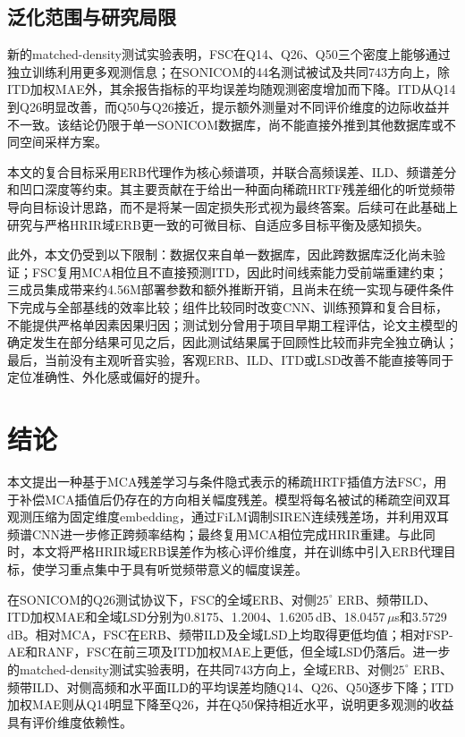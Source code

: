 \documentclass[UTF8,a4paper]{article}
\begin{document}


\subsection{泛化范围与研究局限}
新的matched-density测试实验表明，FSC在Q14、Q26、Q50三个密度上能够通过独立训练利用更多观测信息；在SONICOM的44名测试被试及共同743方向上，除ITD加权MAE外，其余报告指标的平均误差均随观测密度增加而下降。ITD从Q14到Q26明显改善，而Q50与Q26接近，提示额外测量对不同评价维度的边际收益并不一致。该结论仍限于单一SONICOM数据库，尚不能直接外推到其他数据库或不同空间采样方案。

本文的复合目标采用ERB代理作为核心频谱项，并联合高频误差、ILD、频谱差分和凹口深度等约束。其主要贡献在于给出一种面向稀疏HRTF残差细化的听觉频带导向目标设计思路，而不是将某一固定损失形式视为最终答案。后续可在此基础上研究与严格HRIR域ERB更一致的可微目标、自适应多目标平衡及感知损失。

此外，本文仍受到以下限制：数据仅来自单一数据库，因此跨数据库泛化尚未验证；FSC复用MCA相位且不直接预测ITD，因此时间线索能力受前端重建约束；三成员集成带来约4.56M部署参数和额外推断开销，且尚未在统一实现与硬件条件下完成与全部基线的效率比较；组件比较同时改变CNN、训练预算和复合目标，不能提供严格单因素因果归因；测试划分曾用于项目早期工程评估，论文主模型的确定发生在部分结果可见之后，因此测试结果属于回顾性比较而非完全独立确认；最后，当前没有主观听音实验，客观ERB、ILD、ITD或LSD改善不能直接等同于定位准确性、外化感或偏好的提升。

\section{结论}
\label{sec:conclusion}

本文提出一种基于MCA残差学习与条件隐式表示的稀疏HRTF插值方法FSC，用于补偿MCA插值后仍存在的方向相关幅度残差。模型将每名被试的稀疏空间双耳观测压缩为固定维度embedding，通过FiLM调制SIREN连续残差场，并利用双耳频谱CNN进一步修正跨频率结构；最终复用MCA相位完成HRIR重建。与此同时，本文将严格HRIR域ERB误差作为核心评价维度，并在训练中引入ERB代理目标，使学习重点集中于具有听觉频带意义的幅度误差。

在SONICOM的Q26测试协议下，FSC的全域ERB、对侧$25^\circ$ ERB、频带ILD、ITD加权MAE和全域LSD分别为0.8175、1.2004、1.6205\,dB、18.0457\,$\mu$s和3.5729\,dB。相对MCA，FSC在ERB、频带ILD及全域LSD上均取得更低均值；相对FSP-AE和RANF，FSC在前三项及ITD加权MAE上更低，但全域LSD仍落后。进一步的matched-density测试实验表明，在共同743方向上，全域ERB、对侧$25^\circ$ ERB、频带ILD、对侧高频和水平面ILD的平均误差均随Q14、Q26、Q50逐步下降；ITD加权MAE则从Q14明显下降至Q26，并在Q50保持相近水平，说明更多观测的收益具有评价维度依赖性。
\end{document}
